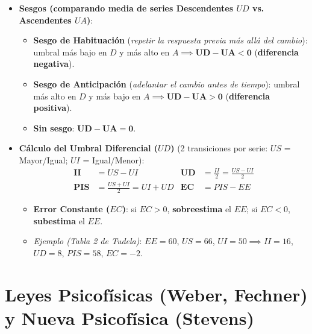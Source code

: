 \documentclass[11pt,a4paper]{article}
\begin{document}
\begin{cajaAlerta}[title={Fórmulas de $UD$ y Detección de Sesgos en el Método de los Límites}]
\begin{itemize}
  \item \textbf{Sesgos (comparando media de series Descendentes $UD$ vs. Ascendentes $UA$)}:
  \begin{itemize}
    \item \textbf{Sesgo de Habituación} (\textit{repetir la respuesta previa más allá del cambio}): umbral más bajo en $D$ y más alto en $A \implies \mathbf{UD - UA < 0}$ (\textbf{diferencia negativa}).
    \item \textbf{Sesgo de Anticipación} (\textit{adelantar el cambio antes de tiempo}): umbral más alto en $D$ y más bajo en $A \implies \mathbf{UD - UA > 0}$ (\textbf{diferencia positiva}).
    \item \textbf{Sin sesgo}: $\mathbf{UD - UA = 0}$.
  \end{itemize}
  \item \textbf{Cálculo del Umbral Diferencial ($UD$)} (2 transiciones por serie: $US$ = Mayor/Igual; $UI$ = Igual/Menor):
  \begin{align*}
    \mathbf{II} &= US - UI & \mathbf{UD} &= \frac{II}{2} = \frac{US - UI}{2} \\
    \mathbf{PIS} &= \frac{US + UI}{2} = UI + UD & \mathbf{EC} &= PIS - EE
  \end{align*}
  \begin{itemize}
    \item \textbf{Error Constante ($EC$)}: si $EC > 0$, \textbf{sobreestima} el $EE$; si $EC < 0$, \textbf{subestima} el $EE$.
    \item \textit{Ejemplo (Tabla 2 de Tudela)}: $EE=60$, $US=66$, $UI=50 \implies II=16$, $UD=8$, $PIS=58$, $EC=-2$.
  \end{itemize}
\end{itemize}
\end{cajaAlerta}

\section{Leyes Psicofísicas (Weber, Fechner) y Nueva Psicofísica (Stevens)}
\end{document}
